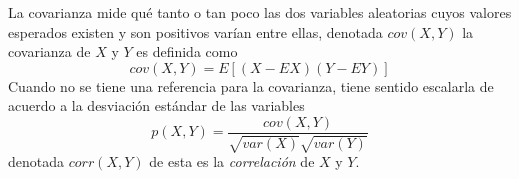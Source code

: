 La covarianza mide qué tanto o tan poco las dos variables aleatorias cuyos valores esperados existen y son positivos varían entre ellas, denotada $cov(X,Y)$ la covarianza de $X$ y $Y$ es definida como
\begin{equation}
cov(X,Y)=E[(X-EX)(Y-EY)]
\end{equation}
Cuando no se tiene una referencia para la covarianza, tiene sentido escalarla de acuerdo a la desviación estándar de las variables\cite{mat17}
\begin{equation}
p(X,Y)=\frac{cov(X,Y)}{\sqrt{var(X)}\sqrt{var(Y)}}
\end{equation}
denotada $corr(X,Y)$ de esta es la \emph{correlación} de $X$ y $Y$.
